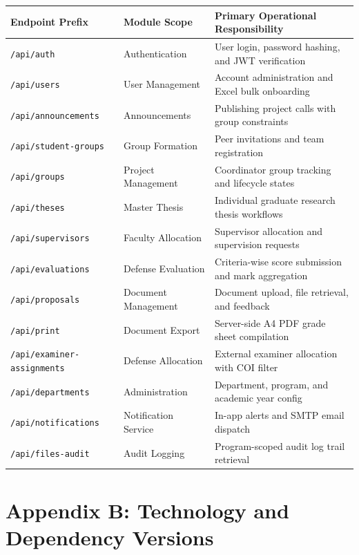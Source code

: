 \documentclass[12pt,a4paper]{report}
\begin{document}
\begin{table}[H]
\centering
\small
\begin{tabularx}{\textwidth}{@{}l p{4.5cm} X@{}}
\toprule
\textbf{Endpoint Prefix} & \textbf{Module Scope} & \textbf{Primary Operational Responsibility} \\
\midrule
\texttt{/api/auth}           & Authentication & User login, password hashing, and JWT verification \\
\texttt{/api/users}          & User Management & Account administration and Excel bulk onboarding \\
\texttt{/api/announcements}  & Announcements & Publishing project calls with group constraints \\
\texttt{/api/student-groups} & Group Formation & Peer invitations and team registration \\
\texttt{/api/groups}         & Project Management & Coordinator group tracking and lifecycle states \\
\texttt{/api/theses}         & Master Thesis & Individual graduate research thesis workflows \\
\texttt{/api/supervisors}    & Faculty Allocation & Supervisor allocation and supervision requests \\
\texttt{/api/evaluations}    & Defense Evaluation & Criteria-wise score submission and mark aggregation \\
\texttt{/api/proposals}      & Document Management & Document upload, file retrieval, and feedback \\
\texttt{/api/print}          & Document Export & Server-side A4 PDF grade sheet compilation \\
\texttt{/api/examiner-assignments} & Defense Allocation & External examiner allocation with COI filter \\
\texttt{/api/departments}    & Administration & Department, program, and academic year config \\
\texttt{/api/notifications}  & Notification Service & In-app alerts and SMTP email dispatch \\
\texttt{/api/files-audit}    & Audit Logging & Program-scoped audit log trail retrieval \\
\bottomrule
\end{tabularx}
\end{table}

\section*{Appendix B: Technology and Dependency Versions}
\end{document}
